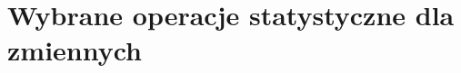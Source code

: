 \documentclass[12pt,a4paper]{report}
\newtheorem{definition}[theorem]{Definicja}
\begin{document}


\section{Wybrane operacje statystyczne dla zmiennych}
\end{document}
